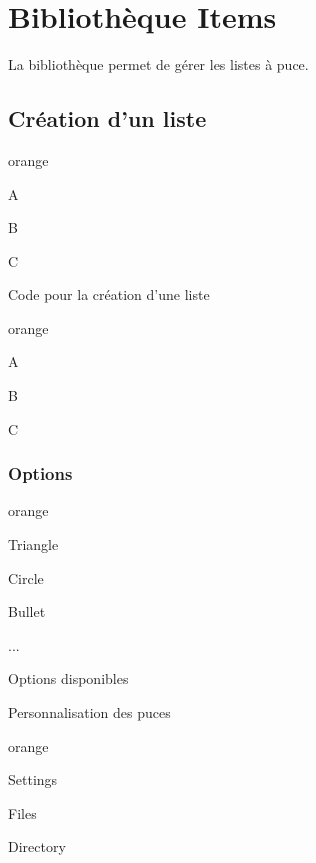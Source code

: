 \chapter{Bibliothèque Items} \label{Items}

La bibliothèque  permet de gérer les listes à puce.

\section{Création d'un liste}

\begin{items}{orange}{\Triangle}
    \item A
    \item B
    \item C
\end{items}

\begin{Latex}{Code pour la création d'une liste}
\begin{items}{orange}{\Triangle}
    \item A
    \item B
    \item C
\end{items}
\end{Latex}


\subsection{Options}

\begin{items}{orange}{\Triangle}
    \item Triangle
    \item Circle
    \item Bullet
    \item \faGear
    \item \faFileText
    \item ...
\end{items}

\begin{Latex}{Options disponibles}
\Triangle
\Bullet 
\Circle
\faGear
\faFileText
\end{Latex}


\begin{Latex}{Personnalisation des puces}
    \begin{items}{orange}{\faFileText}
        \item Settings
        \item Files
        \item Directory
    \end{items}
\end{Latex}


